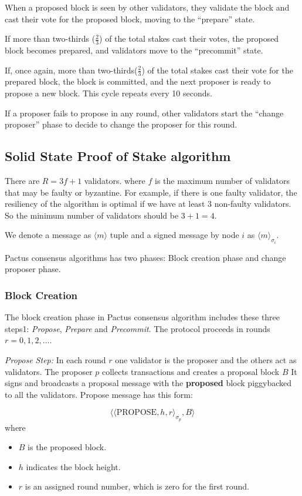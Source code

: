 \documentclass{novel}
\begin{document}
When a proposed block is seen by other validators, they validate the block and cast their vote for the proposed block, moving to the “prepare” state.

If more than two-thirds ($\frac{2}{3}$) of the total stakes cast their votes, the proposed block becomes prepared, and validators move to the “precommit” state.

If, once again, more than two-thirds($\frac{2}{3}$) of the total stakes cast their vote for the prepared block, the block is committed, and the next proposer is ready to propose a new block. This cycle repeats every 10 seconds.

If a proposer fails to propose in any round, other validators start the “change proposer” phase to decide to change the proposer for this round.

\subsection{Solid State Proof of Stake algorithm}
There are $R = 3f+1$  validators. where $f$ is the maximum number of validators that may be faulty or byzantine. For example, if there is one faulty validator, the resiliency of the algorithm is optimal if we have at least 3 non-faulty validators. So the minimum number of validators should be $3+1=4$.

We denote a message as $\langle m \rangle$ tuple and a signed message by node $i$ as $\langle m \rangle_{\sigma_i}$.

Pactus consensus algorithms has two phases: Block creation phase and change proposer phase.

\subsubsection{Block Creation}
The block creation phase in Pactus consensus algorithm includes these three steps1: \emph{Propose}, \emph{Prepare} and \emph{Precommit}. The protocol proceeds in rounds $r = 0, 1, 2, \ldots$.


\noindent \emph{Propose Step:} In each round $r$  one validator is the proposer and the others act as validators. The proposer $p$ collects transactions and creates a proposal block $B$ It signs and broadcasts a proposal message with the \textbf{proposed} block piggybacked to all the validators. Propose message has this form:

\begin{equation*}
    \langle\langle \text{PROPOSE},h,r \rangle_{\sigma_p},B\rangle
\end{equation*}
where
\begin{itemize}
  \item $B$ is the proposed block.
  \item $h$ indicates the block height.
  \item $r$ is an assigned round number, which is zero for the first round.
\end{itemize}
\end{document}
